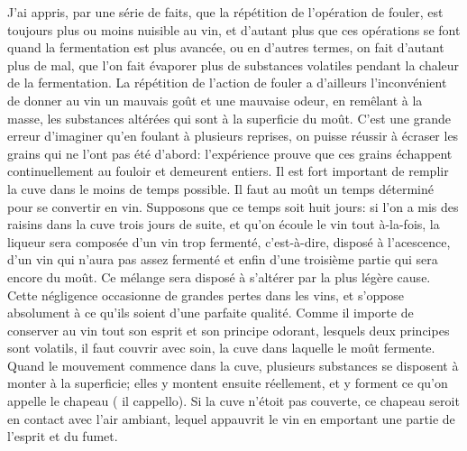 J'ai appris, par une série de faits, que la répétition de l'opération de fouler, est toujours plus ou moins nuisible au vin, et d'autant plus que ces opérations se font quand la fermentation est plus avancée, ou en d'autres termes, on fait d'autant plus de mal, que l'on fait évaporer plus de substances volatiles pendant la chaleur de la fermentation.
La répétition de l'action de fouler a d'ailleurs l'inconvénient de donner au vin un mauvais goût et une mauvaise odeur, en remêlant à la masse, les substances altérées qui sont à la superficie du moût.\setcounter{page}{89} C'est une grande erreur d'imaginer qu'en foulant à plusieurs reprises, on puisse réussir à écraser les grains qui ne l'ont pas été d'abord: l'expérience prouve que ces grains échappent continuellement au fouloir et demeurent entiers.
Il est fort important de remplir la cuve dans le moins de temps possible. Il faut au moût un temps déterminé pour se convertir en vin. Supposons que ce temps soit huit jours: si l'on a mis des raisins dans la cuve trois jours de suite, et qu'on écoule le vin tout à-la-fois, la liqueur sera composée d'un vin trop fermenté, c'est-à-dire, disposé à l'acescence, d'un vin qui n'aura pas assez fermenté et enfin d'une troisième partie qui sera encore du moût. Ce mélange sera disposé à s'altérer par la plus légère cause. Cette négligence occasionne de grandes pertes dans les vins, et s'oppose absolument à ce qu'ils soient d'une parfaite qualité.
Comme il importe de conserver au vin tout son esprit et son principe odorant, lesquels deux principes sont volatils, il faut couvrir avec soin, la cuve dans laquelle le moût fermente.
Quand le mouvement commence dans la cuve, plusieurs substances se disposent à monter à la superficie; elles y montent ensuite\setcounter{page}{90} réellement, et y forment ce qu'on appelle le chapeau ( il cappello). Si la cuve n'étoit pas couverte, ce chapeau seroit en contact avec l'air ambiant, lequel appauvrit le vin en emportant une partie de l'esprit et du fumet.
